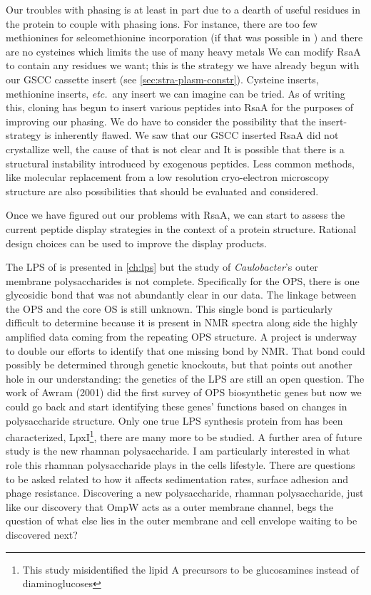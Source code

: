 Our troubles with phasing is at least in part due to a dearth of useful residues in the protein to couple with phasing ions. For instance, there are too few methionines for seleomethionine incorporation (if that was possible in \caulobacter{}) and there are no cysteines which limits the use of many heavy metals We can modify RsaA to contain any residues we want; this is the strategy we have already begun with our GSCC cassette insert (see \cref{sec:stra-plasm-constr}). Cysteine inserts, methionine inserts, \textit{etc.}~any insert we can imagine can be tried. As of writing this, cloning has begun to insert various peptides into RsaA for the purposes of improving our phasing. We do have to consider the possibility that the insert-strategy is inherently flawed. We saw that our GSCC inserted RsaA did not crystallize well, the cause of that is not clear and It is possible that there is a structural instability introduced by exogenous peptides. Less common methods, like molecular replacement from a low resolution cryo-electron microscopy structure are also possibilities that should be evaluated and considered. 

Once we have figured out our problems with RsaA, we can start to assess the current peptide display strategies in the context of a protein  structure. Rational design choices can be used to improve the display products. 

The \ac{LPS} of \caulobacter{} is presented in \cref{ch:lps} but the study of \textit{Caulobacter}'s outer membrane polysaccharides is not complete. Specifically for the \ac{OPS}, there is one glycosidic bond that was not abundantly clear in our data. The linkage between the \ac{OPS} and the core \ac{OS} is still unknown. This  single bond is particularly difficult to determine because it is present in \ac{NMR} spectra along side the highly amplified data coming from the repeating \ac{OPS} structure. A project is underway to double our efforts to identify that one missing bond by \ac{NMR}. That bond could possibly  be determined through genetic knockouts, but that points out another hole in our understanding: the genetics of the \caulobacter{} \ac{LPS} are still an open question. The work of Awram \etal{} (2001) did the first survey of \ac{OPS} biosynthetic genes but now we could go back and start identifying these genes' functions based on changes in polysaccharide structure. Only one true \ac{LPS} synthesis protein from \caulobacter{} has been characterized, LpxI\footnote{This study misidentified the lipid A precursors to be glucosamines instead of diaminoglucoses}, there are many more to be studied. A further area of future study is the new rhamnan polysaccharide. I am particularly interested in what role this rhamnan polysaccharide plays in the cells lifestyle. There are questions to be asked related to how it affects sedimentation rates, surface adhesion and phage resistance. Discovering a new polysaccharide, rhamnan polysaccharide, just like our discovery that OmpW acts as a outer membrane channel, begs the question of what else lies in the outer membrane and cell envelope waiting to be discovered next?
